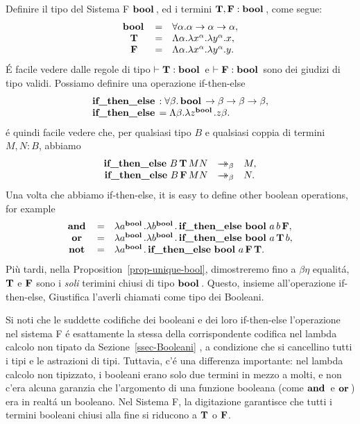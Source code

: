 \documentclass{article}
\begin{document}
Definire il tipo del Sistema F $\mathop{\textbf{\bf bool}\,}$, ed i termini ${\bf T},{\bf F}:\mathop{\textbf{\bf bool}\,}$, come segue:
\[ \begin{array}{ccl}
\mathop{\textbf{\bf bool}\,} &=& \forall\alpha.\alpha\to\alpha\to\alpha,\\
{\bf T} &=& \Lambda\alpha.\lambda x^{\alpha}.\lambda y^{\alpha}.x,\\
{\bf F} &=& \Lambda\alpha.\lambda x^{\alpha}.\lambda y^{\alpha}.y.\\
\end{array}
\]
\'E facile vedere dalle regole di tipo $\vdash{\bf T}:\mathop{\textbf{\bf bool}\,}$ e
$\vdash{\bf F}:\mathop{\textbf{\bf bool}\,}$ sono dei giudizi di tipo validi. Possiamo definire una operazione
if-then-else 
\[ \begin{array}{l}
\mathop{\textbf{\bf if\_then\_else}\,} : \forall\beta.\mathop{\textbf{\bf bool}\,}\to\beta\to\beta\to\beta,
\\  \mathop{\textbf{\bf if\_then\_else}\,} = \Lambda\beta.\lambda z^{\mathop{\textbf{\bf bool}\,}}.z\beta.
\end{array}
\]
\'e quindi facile vedere che, per qualsiasi tipo $B$ e qualsiasi coppia di termini
$M,N:B$, abbiamo
\[ \begin{array}{rcl}
\ifthenelset B\, \truet\, MN &\redbs& M,\\
\ifthenelset B\, \falset\, MN &\redbs& N.
\end{array}
\]
Una volta che abbiamo if-then-else, it is easy to define other boolean
operations, for example
\[ \begin{array}{ccl}
\mathop{\textbf{\bf and}\,} &=& \lambda a^{\mathop{\textbf{\bf bool}\,}}.\lambda b^{\mathop{\textbf{\bf bool}\,}}.\mathop{\textbf{\bf if\_then\_else}\,}\mathop{\textbf{\bf bool}\,} a\,b\,{\bf F},\\
\mathop{\textbf{\bf or}\,} &=& \lambda a^{\mathop{\textbf{\bf bool}\,}}.\lambda b^{\mathop{\textbf{\bf bool}\,}}.\mathop{\textbf{\bf if\_then\_else}\,}\mathop{\textbf{\bf bool}\,} a\,{\bf T}\,b,\\
\mathop{\textbf{\bf not}\,} &=& \lambda a^{\mathop{\textbf{\bf bool}\,}}.\mathop{\textbf{\bf if\_then\_else}\,}\mathop{\textbf{\bf bool}\,} a\,{\bf F}\,{\bf T}.
\end{array}
\]
Pi\`u tardi, nella Proposition~\ref{prop-unique-bool}, dimostreremo fino a
$\beta\eta$ equalit\'a, ${\bf T}$ e ${\bf F}$ sono i {\em soli}
terimini chiusi di tipo $\mathop{\textbf{\bf bool}\,}$. Questo, insieme all'operazione if-then-else,
Giustifica l'averli chiamati come tipo dei Booleani.

Si noti che le suddette codifiche dei booleani e dei loro if-then-else
l'operazione nel sistema F \'e esattamente la stessa della corrispondente
codifica nel  lambda calcolo non tipato da Sezione~\ref{ssec-Booleani}
, a condizione che si cancellino tutti i tipi e le  astrazioni di tipi. Tuttavia, c'\'e
una differenza importante: nel lambda calcolo non tipizzato, i booleani erano solo
due termini in mezzo a molti, e non c'era alcuna garanzia che l'argomento di una
funzione booleana  (come $\mathop{\textbf{\bf and}\,}$ e $\mathop{\textbf{\bf or}\,}$) era in realt\'a un booleano. Nel Sistema F,
la digitazione garantisce che tutti i termini booleani chiusi alla fine si riducono a ${\bf T}$ o ${\bf F}$.
\end{document}
